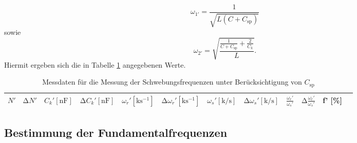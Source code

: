 \begin{equation}
  \omega_{1'} = \frac{1}{\sqrt{L(C+C_{\text{sp}})}}
  \label{eqn:omega1_neu}
\end{equation}
sowie
\begin{equation}
  \omega_{2'} = \sqrt{\frac{ \frac{1}{C+C_{\text{sp}}} + \frac{2}{C_k} }{ L }}.
  \label{eqn:omega2_neu}
\end{equation}
Hiermit ergeben sich die in Tabelle \ref{tab:2} angegebenen Werte.
\begin{table}
  \centering
  \caption{Messdaten für die Messung der Schwebungsfrequenzen unter Berücksichtigung von $C_{\text{sp}}$}
  \label{tab:2}
  \begin{tabular}{c c c c c c c c c c c c}
    \toprule
    {$N'$} & {$\increment N' $} & {$ C_k' [\si{\nano\farad}] $} & {$\increment C_k' [\si{\nano\farad}] $} & {$ \omega_r' [\si{\kilo\second\tothe{-1}}] $} & {$\increment \omega_r' [\si{\kilo\second\tothe{-1}}] $} & {$ \omega_s' [\si{\kilo\per\second}] $} & {$\increment \omega_s' [\si{\kilo\per\second}] $} & {$\frac{\omega_r'}{\omega_s'}_{\text{}}$} & {$\increment \frac{\omega_r'}{\omega_s'}_{\text{}}$} & {f' [\%]} \\
    \midrule
    
    \bottomrule
  \end{tabular}
\end{table}

\subsection{Bestimmung der Fundamentalfrequenzen}

